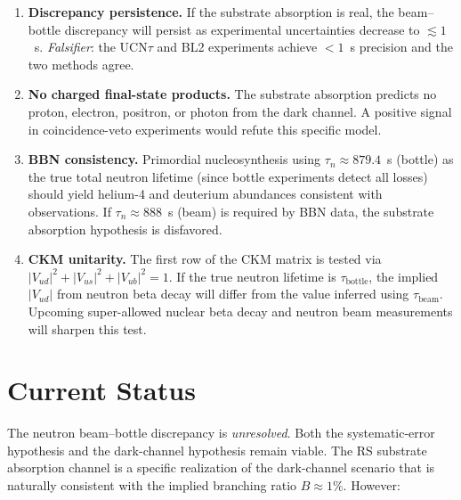 \documentclass[12pt,a4paper]{article}
\theoremstyle{definition}
\theoremstyle{remark}
\begin{document}
\begin{enumerate}
  \item \textbf{Discrepancy persistence.}  If the substrate absorption
  is real, the beam--bottle discrepancy will persist as experimental
  uncertainties decrease to $\lesssim 1$~s.  \emph{Falsifier}: the
  UCN$\tau$ and BL2 experiments achieve $<1$~s precision and the two
  methods agree.

  \item \textbf{No charged final-state products.}  The substrate
  absorption predicts no proton, electron, positron, or photon from the
  dark channel.  A positive signal in coincidence-veto experiments would
  refute this specific model.

  \item \textbf{BBN consistency.}  Primordial nucleosynthesis using
  $\tau_n \approx 879.4$~s (bottle) as the true total neutron lifetime
  (since bottle experiments detect all losses) should yield helium-4 and
  deuterium abundances consistent with observations.  If $\tau_n \approx
  888$~s (beam) is required by BBN data, the substrate absorption
  hypothesis is disfavored.

  \item \textbf{CKM unitarity.}  The first row of the CKM matrix is
  tested via $|V_{ud}|^2 + |V_{us}|^2 + |V_{ub}|^2 = 1$.  If the true
  neutron lifetime is $\tau_{\mathrm{bottle}}$, the implied $|V_{ud}|$
  from neutron beta decay will differ from the value inferred using
  $\tau_{\mathrm{beam}}$.  Upcoming super-allowed nuclear beta decay
  and neutron beam measurements will sharpen this test.
\end{enumerate}

\section{Current Status}
\label{sec:status}

The neutron beam--bottle discrepancy is \emph{unresolved}.  Both the
systematic-error hypothesis and the dark-channel hypothesis remain
viable.  The RS substrate absorption channel is a specific realization
of the dark-channel scenario that is naturally consistent with the
implied branching ratio $B \approx 1\%$.  However:
\end{document}
